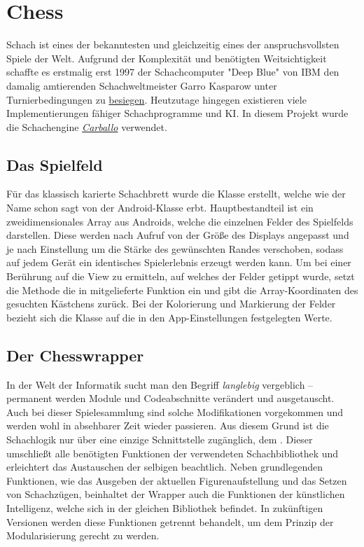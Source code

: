 \section{Chess}
\sectionauthor{\oliver}

Schach ist eines der bekanntesten und gleichzeitig eines der anspruchsvollsten
Spiele der Welt. Aufgrund der Komplexität und benötigten Weitsichtigkeit
schaffte es erstmalig erst 1997 der Schachcomputer "Deep Blue" von IBM den
damalig amtierenden Schachweltmeister Garro Kasparow unter Turnierbedingungen  zu \href{http://www.chessgames.com/perl/chesscollection?cid=1014770}{besiegen}.
Heutzutage hingegen existieren viele Implementierungen
fähiger Schachprogramme und KI. In diesem Projekt wurde die Schachengine
\hyperlink{https://github.com/albertoruibal/carballo}{\emph{Carballo}}
verwendet.

\subsection{Das Spielfeld}

Für das klassisch karierte Schachbrett wurde die Klasse
 erstellt, welche wie der Name schon sagt von der
Android-Klasse  erbt. Hauptbestandteil ist ein zweidimensionales
Array aus Androids, welche die einzelnen Felder des Spielfelds
darstellen. Diese werden nach Aufruf von  der Größe des
Displays angepasst und je nach Einstellung um die Stärke des gewünschten Randes
verschoben, sodass auf jedem Gerät ein identisches Spielerlebnis erzeugt werden
kann. Um bei einer Berührung auf die View zu ermitteln, auf welches der Felder
getippt wurde, setzt die Methode  die in
 mitgelieferte Funktion  ein und gibt
die Array-Koordinaten des gesuchten Kästchens zurück. Bei der Kolorierung und
Markierung der Felder bezieht sich die Klasse auf die in den App-Einstellungen
festgelegten Werte.

\subsection{Der Chesswrapper}

In der Welt der Informatik sucht man den Begriff \emph{langlebig} vergeblich --
permanent werden Module und Codeabschnitte verändert und ausgetauscht. Auch bei
dieser Spielesammlung sind solche Modifikationen vorgekommen und werden wohl in
absehbarer Zeit wieder passieren. Aus diesem Grund ist die Schachlogik nur über
eine einzige Schnittstelle zugänglich, dem . Dieser
umschließt alle benötigten Funktionen der verwendeten Schachbibliothek und
erleichtert das Austauschen der selbigen beachtlich. Neben grundlegenden
Funktionen, wie das Ausgeben der aktuellen Figurenaufstellung und das Setzen
von Schachzügen, beinhaltet der Wrapper auch die Funktionen der künstlichen
Intelligenz, welche sich in der gleichen Bibliothek befindet. In zukünftigen
Versionen werden diese Funktionen getrennt behandelt, um dem Prinzip der 
Modularisierung gerecht zu werden.

